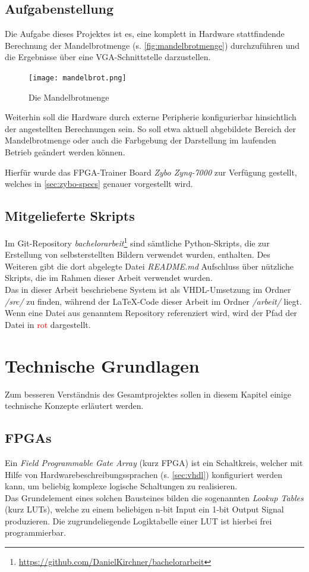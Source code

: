 \documentclass[a4paper,12pt,onesided]{report}
\begin{document}
\section{Aufgabenstellung}
\label{sec:aufgabenstellung}
Die Aufgabe dieses Projektes ist es, eine komplett in Hardware stattfindende Berechnung der Mandelbrotmenge (s. \autoref{fig:mandelbrotmenge}) durchzuführen und die Ergebnisse über eine VGA-Schnittstelle darzustellen.

\begin{figure}[H]
	\centering
	\texttt{[image: mandelbrot.png]}
	\caption{Die Mandelbrotmenge}
	\label{fig:mandelbrotmenge}
\end{figure}

Weiterhin soll die Hardware durch externe Peripherie konfigurierbar hinsichtlich der angestellten Berechnungen sein.
So soll etwa aktuell abgebildete Bereich der Mandelbrotmenge oder auch die Farbgebung der Darstellung im laufenden Betrieb geändert werden können.

Hierfür wurde das FPGA-Trainer Board \textit{Zybo Zynq-7000} zur Verfügung gestellt, welches in \autoref{sec:zybo-specs} genauer vorgestellt wird.

\section{Mitgelieferte Skripts}
Im Git-Repository \textit{bachelorarbeit}\footnote{\url{https://github.com/DanielKirchner/bachelorarbeit}} sind sämtliche Python-Skripts, die zur Erstellung von selbsterstellten Bildern verwendet wurden, enthalten. Des Weiteren gibt die dort abgelegte Datei \textit{README.md} Aufschluss über nützliche Skripts, die im Rahmen dieser Arbeit verwendet wurden.\\
Das in dieser Arbeit beschriebene System ist als VHDL-Umsetzung im Ordner \textit{/src/} zu finden, während der \LaTeX-Code dieser Arbeit im Ordner \textit{/arbeit/} liegt.
Wenn eine Datei aus genanntem Repository referenziert wird, wird der Pfad der Datei in \textcolor{red}{rot} dargestellt.

\chapter{Technische Grundlagen}
Zum besseren Verständnis des Gesamtprojektes sollen in diesem Kapitel einige technische Konzepte erläutert werden.

\section{FPGAs}
\label{sec:fpga}
Ein \textit{Field Programmable Gate Array} (kurz FPGA) ist ein Schaltkreis, welcher mit Hilfe von Hardwarebeschreibungssprachen (s. \autoref{sec:vhdl})
konfiguriert werden kann, um beliebig komplexe logische Schaltungen zu realisieren.\\
Das Grundelement eines solchen Bausteines bilden die sogenannten \textit{Lookup Tables} (kurz LUTs), welche zu einem beliebigen n-bit Input ein 1-bit Output Signal produzieren. Die zugrundeliegende Logiktabelle einer LUT ist hierbei frei programmierbar.
\end{document}
